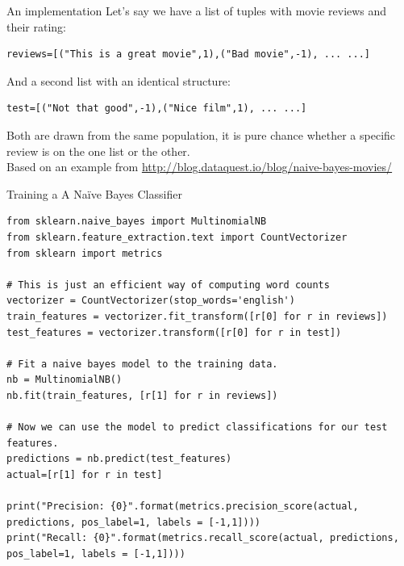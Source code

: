 \documentclass[compress]{beamer}
\begin{document}
\begin{frame}[fragile]{An implementation}
Let's say we have a list of tuples with movie reviews and their rating:
\begin{lstlisting}
reviews=[("This is a great movie",1),("Bad movie",-1), ... ...]
\end{lstlisting}
And a second list with an identical structure:
\begin{lstlisting}
test=[("Not that good",-1),("Nice film",1), ... ...]
\end{lstlisting}
Both are drawn from the same population, it is pure chance whether a specific review is on the one list or the other.\\
\tiny{Based on an example from \url{http://blog.dataquest.io/blog/naive-bayes-movies/}}
\end{frame}


\begin{frame}[fragile]{Training a A Naïve Bayes Classifier}
\begin{lstlisting}
from sklearn.naive_bayes import MultinomialNB
from sklearn.feature_extraction.text import CountVectorizer
from sklearn import metrics

# This is just an efficient way of computing word counts
vectorizer = CountVectorizer(stop_words='english')
train_features = vectorizer.fit_transform([r[0] for r in reviews])
test_features = vectorizer.transform([r[0] for r in test])

# Fit a naive bayes model to the training data.
nb = MultinomialNB()
nb.fit(train_features, [r[1] for r in reviews])

# Now we can use the model to predict classifications for our test features.
predictions = nb.predict(test_features)
actual=[r[1] for r in test]

print("Precision: {0}".format(metrics.precision_score(actual, predictions, pos_label=1, labels = [-1,1])))
print("Recall: {0}".format(metrics.recall_score(actual, predictions, pos_label=1, labels = [-1,1])))
\end{lstlisting}
\end{frame}
%
\end{document}
